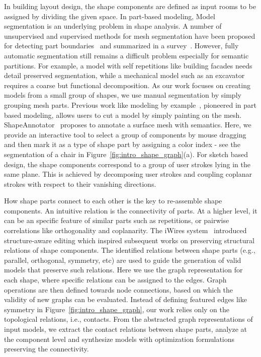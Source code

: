 %
In building layout design, the shape components are defined as input rooms to be assigned by dividing the given space. In part-based modeling, Model segmentation is an underlying problem in shape analysis. A number of unsupervised and supervised methods for mesh segmentation have been proposed for detecting part boundaries~\cite{Sidi11,Wang12} and summarized in a survey~\cite{shamir2008survey}. However, fully automatic segmentation still remains a difficult problem especially for semantic partitions. For example, a model with self repetitions like building facades needs detail preserved segmentation, while a mechanical model such as an excavator requires a coarse but functional decomposition. As our work focuses on creating models from a small group of shapes, we use manual segmentation by simply grouping mesh parts. Previous work like modeling by example~\cite{Funkhouser2004}, pioneered in part based modeling, allows users to cut a model by simply painting on the mesh. ShapeAnnotator~\cite{attene:09} proposes to annotate a surface mesh with semantics. Here, we provide an interactive tool to select a group of components by mouse dragging and then mark it as a type of shape part by assigning a color index - see the segmentation of a chair in Figure~\ref{fig:intro_shape_graph}(a). For sketch based design, the shape components correspond to a group of user strokes lying in the same plane. This is achieved by decomposing user strokes and coupling coplanar strokes with respect to their vanishing directions.

%
How shape parts connect to each other is the key to re-assemble shape components. An intuitive relation is the connectivity of parts. At a higher level, it can be an specific feature of similar parts such as repetitions, or pairwise correlations like orthogonality and coplanarity. The iWires system~\cite{Gal2009} introduced structure-aware editing which inspired subsequent works on preserving structural relations of shape components. The identified relations between shape parts (e.g., parallel, orthogonal, symmetry, etc) are used to guide the generation of valid models that preserve such relations. Here we use the graph representation for each shape, where specific relations can be assigned to the edges. Graph operations are then defined towards node connections, based on which the validity of new graphs can be evaluated. Instead of defining featured edges like symmetry in Figure~\ref{fig:intro_shape_graph}, our work relies only on the topological relations, i.e., contacts. From the abstracted graph representations of input models, we extract the contact relations between shape parts, analyze at the component level and synthesize models with optimization formulations preserving the connectivity.

